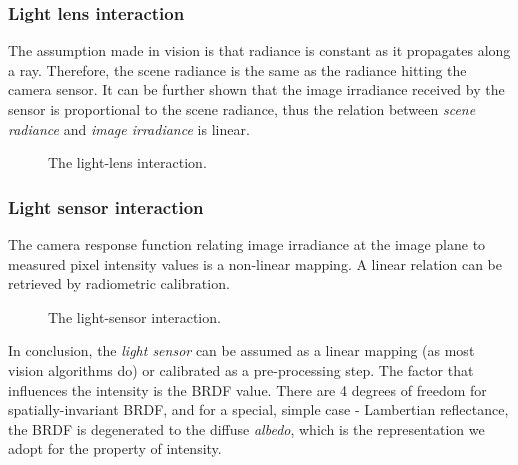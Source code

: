 \subsubsection{Light lens interaction}
The assumption made in vision is that radiance is constant as it propagates along a ray. Therefore, the scene radiance is the same as the radiance hitting the camera sensor. It can be further shown that the image irradiance received by the sensor is proportional to the scene radiance, thus the relation between \textit{scene radiance} and \textit{image irradiance} is linear.
\begin{figure}[!ht]
\centering
{}
\caption{The light-lens interaction.}
\label{fig:light_lens_interact}
\end{figure}

\subsubsection{Light sensor interaction}
The camera response function relating image irradiance at the image plane to measured pixel intensity values is a non-linear mapping. A linear relation can be retrieved by radiometric calibration.
\begin{figure}[!ht]
\centering
{}
\caption{The light-sensor interaction.}
\label{fig:light_sensor_interact}
\end{figure}

In conclusion, the \textit{light sensor} can be assumed as a linear mapping (as most vision algorithms do) or calibrated as a pre-processing step. The factor that influences the intensity is the BRDF value. There are 4 degrees of freedom for spatially-invariant BRDF, and for a special, simple case - Lambertian reflectance, the BRDF is degenerated to the diffuse \textit{albedo}, which is the representation we adopt for the property of intensity.

